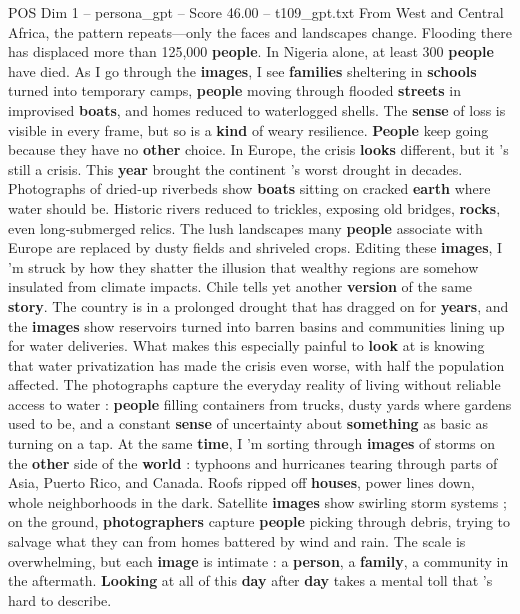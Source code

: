 \begin{textsample}{POS Dim 1 – persona\_gpt – Score 46.00 – t109\_gpt.txt}
From West and Central Africa, the pattern repeats—only the faces and landscapes change.
Flooding there has displaced more than 125,000 \textbf{people}.
In Nigeria alone, at least 300 \textbf{people} have died.
As I go through the \textbf{images}, I see \textbf{families} sheltering in \textbf{schools} turned into temporary camps, \textbf{people} moving through flooded \textbf{streets} in improvised \textbf{boats}, and homes reduced to waterlogged shells.
The \textbf{sense} of loss is visible in every frame, but so is a \textbf{kind} of weary resilience. \textbf{People} keep going because they have no \textbf{other} choice.
In Europe, the crisis \textbf{looks} different, but it ’s still a crisis.
This \textbf{year} brought the continent ’s worst drought in decades.
Photographs of dried‑up riverbeds show \textbf{boats} sitting on cracked \textbf{earth} where water should be.
Historic rivers reduced to trickles, exposing old bridges, \textbf{rocks}, even long‑submerged relics.
The lush landscapes many \textbf{people} associate with Europe are replaced by dusty fields and shriveled crops.
Editing these \textbf{images}, I ’m struck by how they shatter the illusion that wealthy regions are somehow insulated from climate impacts.
Chile tells yet another \textbf{version} of the same \textbf{story}.
The country is in a prolonged drought that has dragged on for \textbf{years}, and the \textbf{images} show reservoirs turned into barren basins and communities lining up for water deliveries.
What makes this especially painful to \textbf{look} at is knowing that water privatization has made the crisis even worse, with half the population affected.
The photographs capture the everyday reality of living without reliable access to water : \textbf{people} filling containers from trucks, dusty yards where gardens used to be, and a constant \textbf{sense} of uncertainty about \textbf{something} as basic as turning on a tap.
At the same \textbf{time}, I ’m sorting through \textbf{images} of storms on the \textbf{other} side of the \textbf{world} : typhoons and hurricanes tearing through parts of Asia, Puerto Rico, and Canada.
Roofs ripped off \textbf{houses}, power lines down, whole neighborhoods in the dark.
Satellite \textbf{images} show swirling storm systems ; on the ground, \textbf{photographers} capture \textbf{people} picking through debris, trying to salvage what they can from homes battered by wind and rain.
The scale is overwhelming, but each \textbf{image} is intimate : a \textbf{person}, a \textbf{family}, a community in the aftermath. \textbf{Looking} at all of this \textbf{day} after \textbf{day} takes a mental toll that ’s hard to describe.

\end{textsample}
